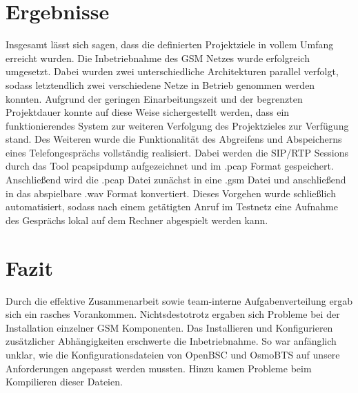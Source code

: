 \section{Ergebnisse} 
Insgesamt lässt sich sagen, dass die definierten Projektziele in vollem Umfang erreicht wurden. Die Inbetriebnahme des GSM Netzes wurde erfolgreich umgesetzt. Dabei wurden zwei unterschiedliche Architekturen parallel verfolgt, sodass letztendlich zwei verschiedene Netze in Betrieb genommen werden konnten. Aufgrund der geringen Einarbeitungszeit und der begrenzten Projektdauer konnte auf diese Weise sichergestellt werden, dass ein funktionierendes System zur weiteren Verfolgung des Projektzieles zur Verfügung stand. Des Weiteren wurde die Funktionalität des Abgreifens und Abspeicherns eines Telefongesprächs vollständig realisiert. Dabei werden die SIP/RTP Sessions durch das Tool pcapsipdump aufgezeichnet und im .pcap Format gespeichert. Anschließend wird die .pcap Datei zunächst in eine .gsm Datei und anschließend in das abspielbare .wav Format konvertiert. Dieses Vorgehen wurde schließlich automatisiert, sodass nach einem getätigten Anruf im Testnetz eine Aufnahme des Gesprächs lokal auf dem Rechner abgespielt werden kann.

\section{Fazit}
Durch die effektive Zusammenarbeit sowie team-interne Aufgabenverteilung ergab sich ein rasches Vorankommen. Nichtsdestotrotz ergaben sich Probleme bei der Installation einzelner GSM Komponenten. Das Installieren und Konfigurieren zusätzlicher Abhängigkeiten erschwerte die Inbetriebnahme. So war anfänglich unklar, wie die Konfigurationsdateien von OpenBSC und OsmoBTS auf unsere Anforderungen angepasst werden mussten. Hinzu kamen Probleme beim Kompilieren dieser Dateien. 



